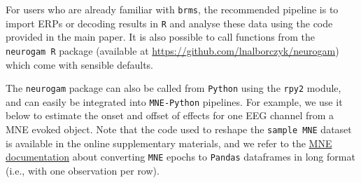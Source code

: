 \documentclass[
  doc,
  floatsintext,
  longtable,
  a4paper,
  nolmodern,
  notxfonts,
  notimes,
  donotrepeattitle,
  colorlinks=true,linkcolor=blue,citecolor=blue,urlcolor=blue]{apa7}
\newenvironment{Shaded}{\begin{snugshade}}{\end{snugshade}}
\newcommand{\AttributeTok}[1]{\textcolor[rgb]{0.40,0.45,0.13}{#1}}
\newcommand{\CommentTok}[1]{\textcolor[rgb]{0.37,0.37,0.37}{#1}}
\newcommand{\DecValTok}[1]{\textcolor[rgb]{0.68,0.00,0.00}{#1}}
\newcommand{\FunctionTok}[1]{\textcolor[rgb]{0.28,0.35,0.67}{#1}}
\newcommand{\NormalTok}[1]{\textcolor[rgb]{0.00,0.23,0.31}{#1}}
\newcommand{\OtherTok}[1]{\textcolor[rgb]{0.00,0.23,0.31}{#1}}
\newcommand{\SpecialCharTok}[1]{\textcolor[rgb]{0.37,0.37,0.37}{#1}}
\newcommand{\StringTok}[1]{\textcolor[rgb]{0.13,0.47,0.30}{#1}}
\begin{document}
For users who are already familiar with \texttt{brms}, the recommended
pipeline is to import ERPs or decoding results in \texttt{R} and analyse
these data using the code provided in the main paper. It is also
possible to call functions from the \texttt{neurogam\ R} package
(available at \url{https://github.com/lnalborczyk/neurogam}) which come
with sensible defaults.

\begin{Shaded}
\end{Shaded}

The \texttt{neurogam} package can also be called from \texttt{Python}
using the \texttt{rpy2} module, and can easily be integrated into
\texttt{MNE-Python} pipelines. For example, we use it below to estimate
the onset and offset of effects for one EEG channel from a MNE evoked
object. Note that the code used to reshape the \texttt{sample\ MNE}
dataset is available in the online supplementary materials, and we refer
to the
\href{https://mne.tools/stable/auto_tutorials/epochs/50_epochs_to_data_frame.html}{MNE
documentation} about converting \texttt{MNE} epochs to \texttt{Pandas}
dataframes in long format (i.e., with one observation per row).
\end{document}
